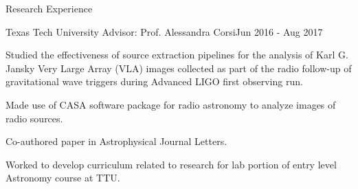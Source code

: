 \documentclass{resume} %
\begin{document}
\begin{rSection}{Research Experience}
\begin{rSubsection}{Texas Tech University}{ }{Advisor: Prof. Alessandra Corsi}{Jun 2016 - Aug 2017}
\item Studied the effectiveness of source extraction pipelines for the analysis of Karl G. Jansky Very Large Array (VLA) images collected as part of the radio follow-up of gravitational wave triggers during Advanced LIGO first observing run.
\item Made use of CASA software package for radio astronomy to analyze images of radio sources.
\item Co-authored paper in Astrophysical Journal Letters.
\item Worked to develop curriculum related to research for lab portion of entry level Astronomy course at TTU.
\end{rSubsection}

\end{rSection}


%
\end{document}

